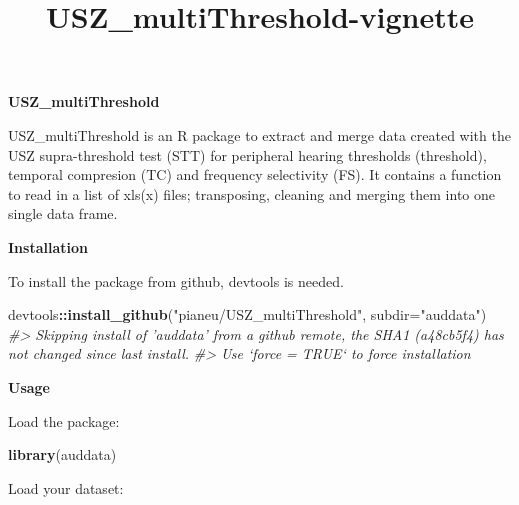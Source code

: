 \documentclass[
]{article}
\title{USZ\_multiThreshold-vignette}
\author{}
\date{\vspace{-2.5em}}
\newenvironment{Shaded}{\begin{snugshade}}{\end{snugshade}}
\newcommand{\CommentTok}[1]{\textcolor[rgb]{0.56,0.35,0.01}{\textit{#1}}}
\newcommand{\DataTypeTok}[1]{\textcolor[rgb]{0.13,0.29,0.53}{#1}}
\newcommand{\KeywordTok}[1]{\textcolor[rgb]{0.13,0.29,0.53}{\textbf{#1}}}
\newcommand{\NormalTok}[1]{#1}
\newcommand{\OperatorTok}[1]{\textcolor[rgb]{0.81,0.36,0.00}{\textbf{#1}}}
\newcommand{\StringTok}[1]{\textcolor[rgb]{0.31,0.60,0.02}{#1}}
\begin{document}
\maketitle

\textbf{USZ\_multiThreshold}

USZ\_multiThreshold is an R package to extract and merge data created
with the USZ supra-threshold test (STT) for peripheral hearing
thresholds (threshold), temporal compresion (TC) and frequency
selectivity (FS). It contains a function to read in a list of xls(x)
files; transposing, cleaning and merging them into one single data
frame.

\textbf{Installation}

To install the package from github, devtools is needed.

\begin{Shaded}
\begin{Highlighting}[]
\NormalTok{devtools}\OperatorTok{::}\KeywordTok{install_github}\NormalTok{(}\StringTok{"pianeu/USZ_multiThreshold"}\NormalTok{, }\DataTypeTok{subdir=}\StringTok{"auddata"}\NormalTok{)}
\CommentTok{#> Skipping install of 'auddata' from a github remote, the SHA1 (a48cb5f4) has not changed since last install.}
\CommentTok{#>   Use `force = TRUE` to force installation}
\end{Highlighting}
\end{Shaded}

\textbf{Usage}

Load the package:

\begin{Shaded}
\begin{Highlighting}[]
\KeywordTok{library}\NormalTok{(auddata)}
\end{Highlighting}
\end{Shaded}

Load your dataset:
\end{document}
